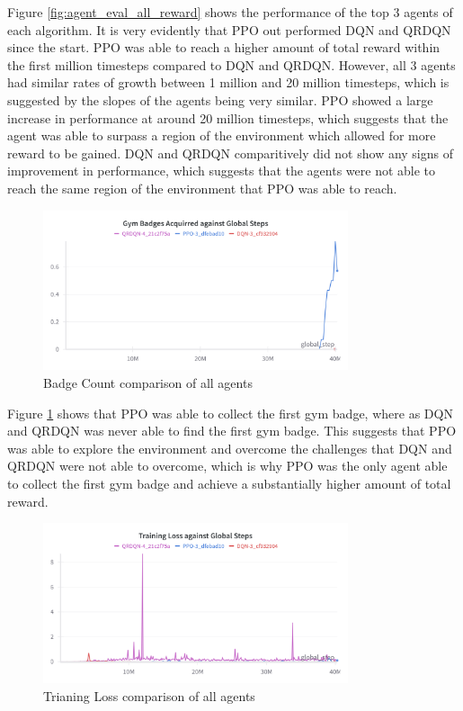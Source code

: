 Figure \ref{fig:agent_eval_all_reward} shows the performance of the top 3 agents of each algorithm. It is very evidently that PPO out performed DQN and QRDQN since the start. PPO was able to reach a higher amount of total reward within the first million timesteps compared to DQN and QRDQN. However, all 3 agents had similar rates of growth between 1 million and 20 million timesteps, which is suggested by the slopes of the agents being very similar. PPO showed a large increase in performance at around 20 million timesteps, which suggests that the agent was able to surpass a region of the environment which allowed for more reward to be gained. DQN and QRDQN comparitively did not show any signs of improvement in performance, which suggests that the agents were not able to reach the same region of the environment that PPO was able to reach.

\begin{figure}[H]
    \centering
    \includegraphics[width=0.8\textwidth]{figures/3_Badge_Count.png}
    \caption{Badge Count comparison of all agents}
    \label{fig:agent_eval_all_badge}
\end{figure}

Figure \ref{fig:agent_eval_all_badge} shows that PPO was able to collect the first gym badge, where as DQN and QRDQN was never able to find the first gym badge. This suggests that PPO was able to explore the environment and overcome the challenges that DQN and QRDQN were not able to overcome, which is why PPO was the only agent able to collect the first gym badge and achieve a substantially higher amount of total reward. 

\begin{figure}[H]
    \centering
    \includegraphics[width=0.8\textwidth]{figures/3_Training_Loss.png}
    \caption{Trianing Loss comparison of all agents}
    \label{fig:agent_eval_all_loss}
\end{figure}

